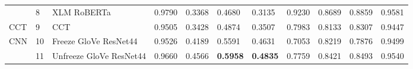 \documentclass[a4paper,english]{rnti}
\begin{document}
\begin{table*}[htb]
{\begin{tabular}{lllllllllll}
 & 8 & XLM RoBERTa & {\cellcolor[HTML]{F2ECF5}} \color[HTML]{000000} 0.9790 & {\cellcolor[HTML]{023D60}} \color[HTML]{F1F1F1} 0.3368 & {\cellcolor[HTML]{034A74}} \color[HTML]{F1F1F1} 0.4680 & {\cellcolor[HTML]{03456C}} \color[HTML]{F1F1F1} 0.3135 & {\cellcolor[HTML]{FBF4F9}} \color[HTML]{000000} 0.9230 & {\cellcolor[HTML]{E1DFED}} \color[HTML]{000000} 0.8689 & {\cellcolor[HTML]{EBE6F2}} \color[HTML]{000000} 0.8859 & {\cellcolor[HTML]{B9C6E0}} \color[HTML]{000000} 0.9581 \\
\cline{1-11} 
CCT & 9 & CCT & {\cellcolor[HTML]{023858}} \color[HTML]{F1F1F1} 0.9505 & {\cellcolor[HTML]{034973}} \color[HTML]{F1F1F1} 0.3428 & {\cellcolor[HTML]{0569A4}} \color[HTML]{F1F1F1} 0.4874 & {\cellcolor[HTML]{0872B1}} \color[HTML]{F1F1F1} 0.3507 & {\cellcolor[HTML]{4A98C5}} \color[HTML]{F1F1F1} 0.7983 & {\cellcolor[HTML]{023858}} \color[HTML]{F1F1F1} 0.8133 & {\cellcolor[HTML]{3991C1}} \color[HTML]{F1F1F1} 0.8307 & {\cellcolor[HTML]{023858}} \color[HTML]{F1F1F1} 0.9447 \\
\cline{1-11} 
\multirow[c]{3}{*}{CNN} & 10 & Freeze GloVe ResNet44 & {\cellcolor[HTML]{034A74}} \color[HTML]{F1F1F1} 0.9526 & {\cellcolor[HTML]{9EBAD9}} \color[HTML]{000000} 0.4189 & {\cellcolor[HTML]{CACEE5}} \color[HTML]{000000} 0.5591 & {\cellcolor[HTML]{EEE8F3}} \color[HTML]{000000} 0.4631 & {\cellcolor[HTML]{023858}} \color[HTML]{F1F1F1} 0.7053 & {\cellcolor[HTML]{045A8D}} \color[HTML]{F1F1F1} 0.8219 & {\cellcolor[HTML]{023858}} \color[HTML]{F1F1F1} 0.7876 & {\cellcolor[HTML]{0A73B2}} \color[HTML]{F1F1F1} 0.9499 \\

 & 11 & Unfreeze GloVe ResNet44 & {\cellcolor[HTML]{71A8CE}} \color[HTML]{F1F1F1} 0.9660 & {\cellcolor[HTML]{EBE6F2}} \color[HTML]{000000} 0.4566 & {\cellcolor[HTML]{FFF7FB}} \color[HTML]{000000} \bfseries 0.5958 & {\cellcolor[HTML]{FFF7FB}} \color[HTML]{000000} \bfseries 0.4835 & {\cellcolor[HTML]{1E80B8}} \color[HTML]{F1F1F1} 0.7759 & {\cellcolor[HTML]{509AC6}} \color[HTML]{F1F1F1} 0.8421 & {\cellcolor[HTML]{86B0D3}} \color[HTML]{000000} 0.8493 & {\cellcolor[HTML]{65A3CB}} \color[HTML]{F1F1F1} 0.9540 \\


\end{tabular}}
\end{table*}
\end{document}
